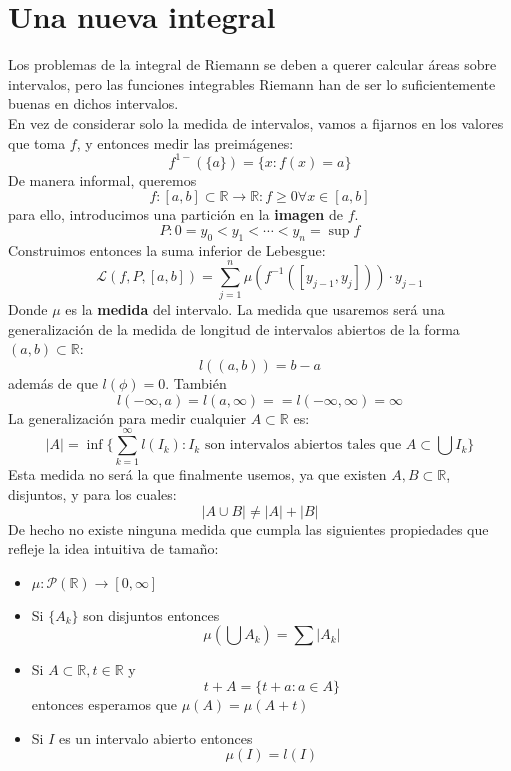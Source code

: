 \documentclass{./Calculo.tex}
\begin{document}
\section{Una nueva integral}
Los problemas de la integral de Riemann se deben a querer calcular áreas sobre intervalos, pero las funciones integrables Riemann han de ser lo suficientemente buenas en dichos intervalos.\\
En vez de considerar solo la medida de intervalos, vamos a fijarnos en los valores que toma $f$, y entonces medir las preimágenes:
\[
	f^{1-}(\{ a \}) = \{ x : f(x) = a \}
\]
De manera informal, queremos
\[
	f: [a,b] \subset \mathbb{R} \to \mathbb{R} : f \geq 0 \forall x \in [a,b]
\]
para ello, introducimos una partición en la \textbf{imagen} de $f$. 
\[
	P : 0 = y_0 < y_1 <\cdots < y_{n} = \sup f
\]
Construimos entonces la suma inferior de Lebesgue:
\[
	\mathcal{L}(f, P, [a,b]) = \sum _{j=1}^{n} \mu (f^{-1}([y_{j-1}, y_{j}])) \cdot y_{j-1}
\]
Donde $\mu$ es la \textbf{medida} del intervalo. La medida que usaremos será una generalización de la medida de longitud de intervalos abiertos de la forma $(a,b) \subset \mathbb{R}$:
\[
	l((a,b)) = b-a
\]
además de que $l(\phi) = 0$. También 
\[
	l(-\infty, a) = l(a,\infty) = = l(-\infty, \infty) = \infty
\]
La generalización para medir cualquier $A \subset \mathbb{R}$ es:
\[
	|A| = \inf \{ \sum_{k=1}^{\infty}l(I_{k}) : I_{k} \text{ son intervalos abiertos tales que }A \subset \bigcup I_{k} \}
\]
Esta medida no será la que finalmente usemos, ya que existen $A, B \subset  \mathbb{R}$, disjuntos, y para los cuales:
\[
	|A \cup B| \neq |A| + |B|
\]
De hecho no existe ninguna medida que cumpla las siguientes propiedades que refleje la idea intuitiva de tamaño:
\begin{itemize}
	\item $\mu: \mathcal{P}(\mathbb{R}) \to [0, \infty]$ 
	\item Si $\{ A_{k} \}$ son disjuntos entonces 
		\[
			\mu(\bigcup A_{k} ) = \sum |A_{k}|
		\]
	\item Si $A \subset \mathbb{R}, t \in \mathbb{R}$ y 
		\[
			t+ A = \{ t+a : a \in A \}
		\]
		entonces esperamos que $\mu(A) = \mu(A+t)$ 
	\item Si $I$ es un intervalo abierto entonces
		\[
			\mu(I) = l(I)
		\]
\end{itemize}
\end{document}
